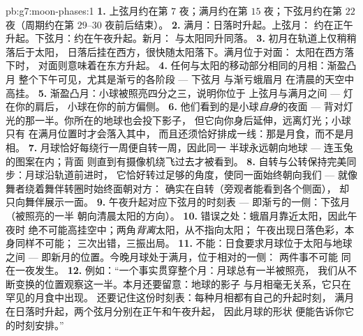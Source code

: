 \begin{solution}{pb:g7:moon-phases:1}
\textbf{1.} 上弦月约在第 $7$ 夜；满月约在第
$15$ 夜；下弦月约在第 $22$ 夜（周期约在第
$29$--$30$ 夜前后结束）。
\textbf{2.} 满月：日落时升起。上弦月：
约在正午升起。下弦月：约在午夜升起。新月：
与太阳同升同落。
\textbf{3.} 初月在轨道上仅稍稍落后于太阳，
日落后挂在西方，很快随太阳落下。满月位于对面：
太阳在西方落下时，
对面则意味着在东方升起。
\textbf{4.} 任何与太阳的移动部分相同的月相：渐盈凸月
整个下午可见，尤其是渐亏的各阶段 --- 下弦月
与渐亏蛾眉月
在清晨的天空中高挂。
\textbf{5.} 渐盈凸月：小球被照亮四分之三，说明你位于
上弦月与满月之间 --- 灯在你的肩后，
小球在你的前方偏侧。
\textbf{6.} 他们看到的是小球\emph{自身}的夜面 ---
背对灯光的那一半。你所在的地球也会投下影子，
但它向你身后延伸，远离灯光；小球只有
在满月位置时才会落入其中，
而且还须恰好排成一线：那是月食，而不是月相。
\textbf{7.} 月球恰好每绕行一周便自转一周，因此同一
半球永远朝向地球 --- 连玉兔的图案在内；背面
则直到有摄像机绕飞过去才被看到。
\textbf{8.} 自转与公转保持完美同步：月球沿轨道前进时，
它恰好转过足够的角度，使同一面始终朝向我们 ---
就像舞者绕着舞伴转圈时始终面朝对方：
确实在自转（旁观者能看到各个侧面），
却只向舞伴展示一面。
\textbf{9.} 午夜升起对应下弦月的时刻表 ---
即渐亏的一侧：下弦月（被照亮的一半
朝向清晨太阳的方向）。
\textbf{10.} 错误之处：蛾眉月靠近太阳，因此午夜时
绝不可能高挂空中；两角\emph{背离}太阳，从不指向太阳；
午夜出现日落色彩，本身同样不可能；
三次出错，三振出局。
\textbf{11.} 不能：日食要求月球位于太阳与地球之间 ---
即新月的位置。今晚月球处于满月，位于相对的一侧：
两件事不可能
同在一夜发生。
\textbf{12.} 例如：“一个事实贯穿整个月：月球总有一半被照亮，
我们从不断变换的位置观察这一半。本月还要留意：地球的影子
与月相毫无关系，它只在罕见的月食中出现。
还要记住这份时刻表：每种月相都有自己的升起时刻，
满月在日落时升起，两个弦月分别在正午和午夜升起，
因此月球的形状
便能告诉你它的时刻安排。”
\end{solution}
